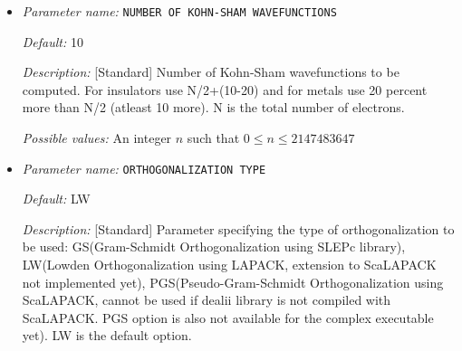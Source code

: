 \begin{itemize}


{\it Default:} -10.0


{\it Description:} [Developer] The lower bound of the wanted eigen spectrum.


{\it Possible values:} A floating point number $v$ such that $-\text{MAX\_DOUBLE} \leq v \leq \text{MAX\_DOUBLE}$
\item {\it Parameter name:} {\tt NUMBER OF KOHN-SHAM WAVEFUNCTIONS}
\label{parameters:SCF parameters/Eigen_2dsolver_2fChebyshev solver related parameters/NUMBER OF KOHN_2dSHAM WAVEFUNCTIONS}
\label{parameters:SCF_20parameters/Eigen_2dsolver_2fChebyshev_20solver_20related_20parameters/NUMBER_20OF_20KOHN_2dSHAM_20WAVEFUNCTIONS}




{\it Default:} 10


{\it Description:} [Standard] Number of Kohn-Sham wavefunctions to be computed. For insulators use N/2+(10-20) and for metals use 20 percent more than N/2 (atleast 10 more). N is the total number of electrons.


{\it Possible values:} An integer $n$ such that $0\leq n \leq 2147483647$
\item {\it Parameter name:} {\tt ORTHOGONALIZATION TYPE}
\label{parameters:SCF parameters/Eigen_2dsolver_2fChebyshev solver related parameters/ORTHOGONALIZATION TYPE}
\label{parameters:SCF_20parameters/Eigen_2dsolver_2fChebyshev_20solver_20related_20parameters/ORTHOGONALIZATION_20TYPE}




{\it Default:} LW


{\it Description:} [Standard] Parameter specifying the type of orthogonalization to be used: GS(Gram-Schmidt Orthogonalization using SLEPc library), LW(Lowden Orthogonalization using LAPACK, extension to ScaLAPACK not implemented yet), PGS(Pseudo-Gram-Schmidt Orthogonalization using ScaLAPACK, cannot be used if dealii library is not compiled with ScaLAPACK. PGS option is also not available for the complex executable yet). LW is the default option.



\end{itemize}
